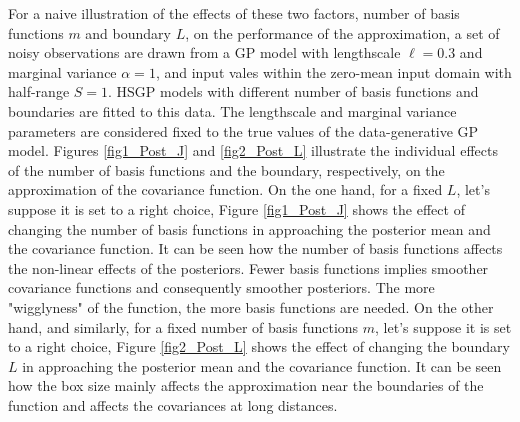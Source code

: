 \documentclass[]{interact}
\theoremstyle{plain}%
\theoremstyle{definition}
\theoremstyle{remark}
\begin{document}
For a naive illustration of the effects of these two factors, number of basis functions $m$ and boundary $L$, on the performance of the approximation, a set of noisy observations are drawn from a GP model with lengthscale $\ell=0.3$ and marginal variance $\alpha=1$, and input vales within the zero-mean input domain with half-range $S=1$. HSGP models with different number of basis functions and boundaries are fitted to this data. The lengthscale and marginal variance parameters are considered fixed to the true values of the data-generative GP model. Figures \ref{fig1_Post_J} and \ref{fig2_Post_L} illustrate the individual effects of the number of basis functions and the boundary, respectively, on the approximation of the covariance function. On the one hand, for a fixed $L$, let's suppose it is set to a right choice, Figure \ref{fig1_Post_J} shows the effect of changing the number of basis functions in approaching the posterior mean and the covariance function. It can be seen how the number of basis functions affects the non-linear effects of the posteriors. Fewer basis functions implies smoother covariance functions and consequently smoother posteriors. The more "wigglyness" of the function, the more basis functions are needed. On the other hand, and similarly, for a fixed number of basis functions $m$, let's suppose it is set to a right choice, Figure \ref{fig2_Post_L} shows the effect of changing the boundary $L$ in approaching the posterior mean and the covariance function. It can be seen how the box size mainly affects the approximation near the boundaries of the function and affects the covariances at long distances. \\
\end{document}
